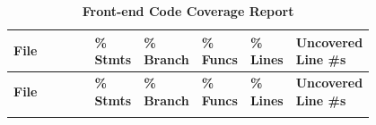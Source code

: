 \documentclass[12pt, titlepage]{article}
\begin{document}
\begin{longtable}{|S{0.3\linewidth} | >{\centering\arraybackslash}p{0.1\linewidth} | >{\centering\arraybackslash}p{0.1\linewidth} | >{\centering\arraybackslash}p{0.1\linewidth} | >{\centering\arraybackslash}p{0.1\linewidth} | U{0.1\linewidth}|}
    \caption{\bf Front-end Code Coverage Report} \label{tab:coverage} \\
      \hline
      \textbf{File} & \textbf{\% Stmts} & \textbf{\% Branch} & \textbf{\% Funcs} & \textbf{\% Lines} & \textbf{Uncovered Line \#s} \\
      \hline
      \endfirsthead
      
      \hline
      \textbf{File} & \textbf{\% Stmts} & \textbf{\% Branch} & \textbf{\% Funcs} & \textbf{\% Lines} & \textbf{Uncovered Line \#s} \\
      \hline
      \endhead
      
      \hline
      \endfoot
      
      \hline
      \endlastfoot


\end{longtable}
\end{document}

